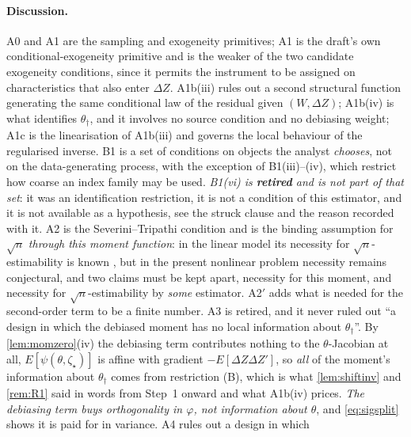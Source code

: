 \clearpage

\paragraph{Discussion.}
A0 and A1 are the sampling and exogeneity primitives; A1 is the draft's own conditional-exogeneity primitive and is
the weaker of the two candidate exogeneity conditions, since it permits the instrument to be assigned on
characteristics that also enter $\Delta Z$. A1b(iii) rules out a second structural function generating
the same conditional law of the residual given $(W,\Delta Z)$; A1b(iv) is what identifies
$\theta_\dagger$, and it involves no source condition and no debiasing weight; A1c is the linearisation
of A1b(iii) and governs the local behaviour of the regularised inverse. B1 is a set of conditions on
objects the analyst \emph{chooses}, not on the data-generating process, with the exception of
B1(iii)--(iv), which restrict how coarse an index family may be used. \emph{B1(vi) is \textbf{retired} and is
not part of that set}: it was an identification restriction, it is not a condition of this estimator, and it
is not available as a hypothesis, see the struck clause and the reason recorded with it. A2 is the
Severini--Tripathi condition and is the binding
assumption for $\sqrt n$ \emph{through this moment function}: in the linear model its necessity for
$\sqrt n$-estimability is known \citep{severini2006}, but in the present nonlinear problem necessity
remains conjectural, and two claims must be kept apart, necessity for this moment, and necessity for
$\sqrt n$-estimability by \emph{some} estimator. A2$'$ adds what is needed for the second-order term to
be a finite number. A3 is retired, and it never ruled out ``a design in which the
debiased moment has no local information about $\theta_\dagger$''. By \cref{lem:momzero}\textup{(iv)} the debiasing
term contributes nothing to the $\theta$-Jacobian at all, $E[\psi(\theta,\zeta_\star)]$ is affine with
gradient $-E[\Delta Z\Delta Z']$, so \emph{all} of the moment's information about $\theta_\dagger$
comes from restriction (B), which is what \cref{lem:shiftinv} and \cref{rem:R1} said in words from Step~1
onward and what A1b(iv) prices. \emph{The debiasing term buys orthogonality in $\varphi$, not information
about $\theta$}, and \eqref{eq:sigsplit} shows it is paid for in variance. A4 rules out a design in which
